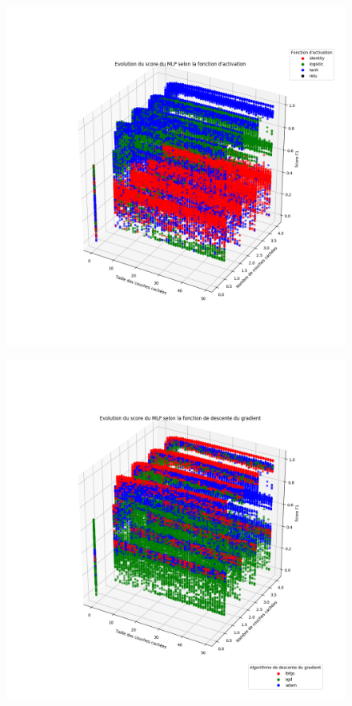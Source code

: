 \documentclass[usenames,dvipsnames]{beamer}
\begin{document}
\begin{frame}
\begin{figure}
\centering
\includegraphics[width=.7\textwidth]{img/mlp_activation.png}
\end{figure}
\end{frame}

\begin{frame}
\begin{figure}
\centering
\includegraphics[width=.7\textwidth]{img/mlp_solver.png}
\end{figure}
\end{frame}
\end{document}
